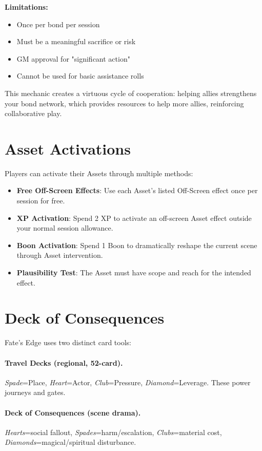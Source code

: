 \textbf{Limitations:}
\begin{itemize}
    \item Once per bond per session
    \item Must be a meaningful sacrifice or risk
    \item GM approval for "significant action"
    \item Cannot be used for basic assistance rolls
\end{itemize}

This mechanic creates a virtuous cycle of cooperation: helping allies strengthens your bond network, which provides resources to help more allies, reinforcing collaborative play.

\section{Asset Activations}

Players can activate their Assets through multiple methods:

\begin{itemize}
    \item \textbf{Free Off-Screen Effects}: Use each Asset's listed Off-Screen effect once per session for free.
    \item \textbf{XP Activation}: Spend 2 XP to activate an off-screen Asset effect outside your normal session allowance.
    \item \textbf{Boon Activation}: Spend 1 Boon to dramatically reshape the current scene through Asset intervention.
    \item \textbf{Plausibility Test}: The Asset must have scope and reach for the intended effect.
\end{itemize}

\section{Deck of Consequences}

Fate's Edge uses two distinct card tools:

\paragraph{Travel Decks (regional, 52-card).}
\emph{Spade}=Place, \emph{Heart}=Actor, \emph{Club}=Pressure, \emph{Diamond}=Leverage. These power journeys and gates.

\paragraph{Deck of Consequences (scene drama).}
\emph{Hearts}=social fallout, \emph{Spades}=harm/escalation, \emph{Clubs}=material cost, \emph{Diamonds}=magical/spiritual disturbance.

